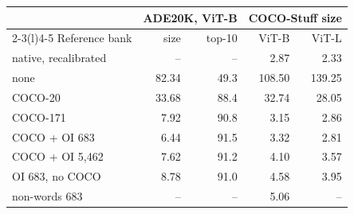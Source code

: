 \begin{tabular}{@{}lrrrr@{}}
\toprule
 & \multicolumn{2}{c}{ADE20K, ViT-B} & \multicolumn{2}{c}{COCO-Stuff size} \\
\cmidrule(lr){2-3}\cmidrule(l){4-5}
Reference bank & size & top-10 & ViT-B & ViT-L \\
\midrule
native, recalibrated & -- & -- & 2.87 & 2.33 \\
\midrule
none & 82.34 & 49.3 & 108.50 & 139.25 \\
COCO-20 & 33.68 & 88.4 & 32.74 & 28.05 \\
COCO-171 & 7.92 & 90.8 & 3.15 & 2.86 \\
COCO + OI 683 & 6.44 & 91.5 & 3.32 & 2.81 \\
COCO + OI 5,462 & 7.62 & 91.2 & 4.10 & 3.57 \\
OI 683, no COCO & 8.78 & 91.0 & 4.58 & 3.95 \\
non-words 683 & -- & -- & 5.06 & -- \\
\bottomrule
\end{tabular}
